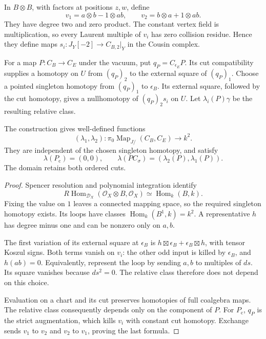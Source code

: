 In $B\otimes B$, with factors at positions $z,w$, define
\begin{equation}\label{cbc:rc:relative-inputs}
 v_1=a\otimes b-1\otimes ab,
 \qquad v_2=b\otimes a+1\otimes ab.
\end{equation}
They have degree two and zero product. The constant vertex
field is multiplication, so every Laurent multiple of
$v_i$ has zero collision residue. Hence they define maps
$s_i:J_Y[-2]\to C_{B,2}|_Y$ in the Cousin complex.

For a map $P:C_B\to C_E$ under the vacuum, put
$q_P=C_{\epsilon_E}P$. Its cut compatibility supplies
a homotopy on $U$ from $(q_P)_2$ to the external square
of $(q_P)_1$. Choose a pointed singleton homotopy from
$(q_P)_1$ to $\epsilon_B$. Its external square, followed
by the cut homotopy, gives a nullhomotopy of $(q_P)_2s_i$ on $U$.
Let $\lambda_i(P)\gamma$ be the resulting relative class.

\begin{proposition}\label{cbc:rc:relative-invariant}
The construction gives well-defined functions
\[
 (\lambda_1,\lambda_2):
 \pi_0\operatorname{Map}_{J/}(C_B,C_E)\longrightarrow k^2.
\]
They are independent of the chosen singleton homotopy,
and satisfy
\[
 \lambda(P_{\mathrm c})=(0,0),\qquad
 \lambda(PC_\sigma)=(\lambda_2(P),\lambda_1(P)).
\]
The domain retains both ordered cuts.
\end{proposition}
\begin{proof}
Spencer resolution and polynomial integration identify
\[
 R\operatorname{Hom}_{\mathcal D_X}
 (\mathcal O_X\otimes B,\mathcal O_X)
 \simeq\operatorname{Hom}_k(B,k).
\]
Fixing the value on $1$ leaves a connected mapping space,
so the required singleton homotopy exists. Its loops have
classes $\operatorname{Hom}_k(B^1,k)=k^2$.
A representative $h$ has degree minus one and can be
nonzero only on $a,b$.

The first variation of its external
square at $\epsilon_B$ is
$h\boxtimes\epsilon_B+\epsilon_B\boxtimes h$, with tensor
Koszul signs. Both terms vanish on $v_i$: the other odd
input is killed by $\epsilon_B$, and $h(ab)=0$.
Equivalently, represent the loop by sending $a,b$ to
multiples of $ds$. Its square vanishes because $ds^2=0$.
The relative class therefore does not depend on this
choice.

Evaluation on a chart and its cut preserves homotopies
of full coalgebra maps. The relative class consequently
depends only on the component of $P$.
For $P_{\mathrm c}$, $q_P$ is the strict augmentation,
which kills $v_i$ with constant cut homotopy. Exchange
sends $v_1$ to $v_2$ and $v_2$ to $v_1$, proving the
last formula.
\end{proof}

